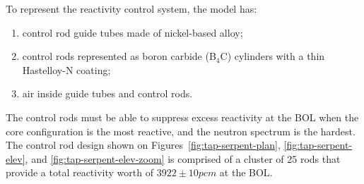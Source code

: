 To represent the reactivity control system, the model has: 
\begin{enumerate}[label=(\alph*), noitemsep]
	\item control rod guide tubes made of nickel-based alloy;
	\item control rods represented as boron carbide (B$_4$C) cylinders 
	with a thin Hastelloy-N coating;
	\item air inside guide tubes and control rods.
\end{enumerate}
The control rods must be able to suppress excess reactivity at the \gls{BOL} 
when the core configuration is the most reactive, and the neutron spectrum is 
the hardest. The control rod design shown on 
Figures~\ref{fig:tap-serpent-plan}, \ref{fig:tap-serpent-elev}, and 
\ref{fig:tap-serpent-elev-zoom} is comprised of a cluster of 25 rods that 
provide a total reactivity worth of $3922\pm10pcm$ at the \gls{BOL}.

